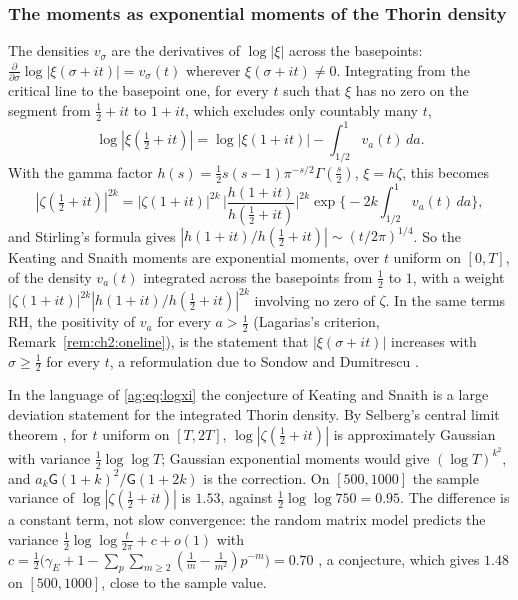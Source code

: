 \subsubsection{The moments as exponential moments of the Thorin density}

The densities $v_\sigma$ are the derivatives of $\log|\xi|$ across the basepoints: $\frac\partial{\partial\sigma}\log|\xi(\sigma+it)|=v_\sigma(t)$ wherever $\xi(\sigma+it)\ne0$. Integrating from the critical line to the basepoint one, for every $t$ such that $\xi$ has no zero on the segment from $\frac12+it$ to $1+it$, which excludes only countably many $t$,
\begin{equation}\label{ag:eq:logxi}
\log|\xi(\tfrac12+it)|=\log|\xi(1+it)|-\int_{1/2}^1v_a(t)\,da .
\end{equation}
With the gamma factor $h(s)=\frac12s(s-1)\pi^{-s/2}\Gamma(\frac s2)$, $\xi=h\zeta$, this becomes
\[
|\zeta(\tfrac12+it)|^{2k}=|\zeta(1+it)|^{2k}\,\Big|\frac{h(1+it)}{h(\frac12+it)}\Big|^{2k}\exp\Big\{-2k\int_{1/2}^1v_a(t)\,da\Big\},
\]
and Stirling's formula gives $|h(1+it)/h(\frac12+it)|\sim(t/2\pi)^{1/4}$. So the Keating and Snaith moments are exponential moments, over $t$ uniform on $[0,T]$, of the density $v_a(t)$ integrated across the basepoints from $\frac12$ to $1$, with a weight $|\zeta(1+it)|^{2k}|h(1+it)/h(\frac12+it)|^{2k}$ involving no zero of $\zeta$. In the same terms RH, the positivity of $v_a$ for every $a>\frac12$ (Lagarias's criterion, Remark~\ref{rem:ch2:oneline}), is the statement that $|\xi(\sigma+it)|$ increases with $\sigma\ge\frac12$ for every $t$, a reformulation due to Sondow and Dumitrescu \cite{SD10}.

In the language of \eqref{ag:eq:logxi} the conjecture of Keating and Snaith is a large deviation statement for the integrated Thorin density. By Selberg's central limit theorem \cite{Selberg46}, for $t$ uniform on $[T,2T]$, $\log|\zeta(\frac12+it)|$ is approximately Gaussian with variance $\frac12\log\log T$; Gaussian exponential moments would give $(\log T)^{k^2}$, and $a_k\mathsf G(1+k)^2/\mathsf G(1+2k)$ is the correction. On $[500,1000]$ the sample variance of $\log|\zeta(\frac12+it)|$ is $1.53$, against $\frac12\log\log750=0.95$. The difference is a constant term, not slow convergence: the random matrix model predicts the variance $\frac12\log\log\frac t{2\pi}+c+o(1)$ with $c=\frac12\big(\gamma_E+1-\sum_p\sum_{m\ge2}(\frac1m-\frac1{m^2})p^{-m}\big)=0.70$ \cite{KS00}, a conjecture, which gives $1.48$ on $[500,1000]$, close to the sample value.

